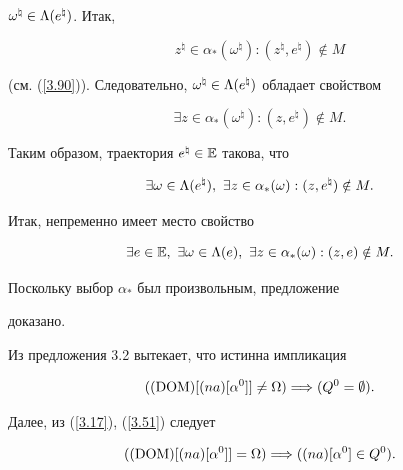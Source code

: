 \begin{pf}
${\omega}^\natural \in {{\Lambda}({e^\natural})}$. Итак,


$$


{z^\natural}\in {{\alpha}_*}({\omega}^\natural):({z^\natural},{e^\natural})


\notin M


$$


(см. (\ref{3.90})). Следовательно, ${\omega}^\natural \in


{{\Ld}({e^\natural})}$ обладает свойством


$$


\exi{z} \in


{{\alpha}_*}({\omega}^\natural):(z,{e^\natural}) \notin M.


$$


Таким образом, траектория ${e^\natural} \in \Bbb{E}$ такова, что


$$


\exi{\omega} \in {{\Ld}({e^\natural})}, \ \exi{z} \in


{{\alpha}_*}(\omega):(z,{e^\natural}) \notin M.


$$


Итак, непременно имеет место свойство


$$


\exi{e} \in \Bbb{E}, \ \exi{\omega}


\in {{\Ld}(e)}, \ \exi{z} \in {{\alpha}_*}(\omega):(z,e) \notin M.


$$


Поскольку выбор ${\alpha}_*$ был произвольным, предложение


доказано.


\end{pf}





Из предложения 3.2 вытекает, что истинна импликация


\begin{equation}\label{3.98}


((\DOM)[(na)[{\alpha}^0]] \ne \Om) \Lo ({Q^0} = \emp).


\end{equation}


Далее, из (\ref{3.17}), (\ref{3.51}) следует


\begin{equation}\label{3.99}


((\DOM)[(na)[{\alpha}^0]] = \Om) \Lo ((na)[{{\alpha}^0}] \in {Q^0}).


\end{equation}


